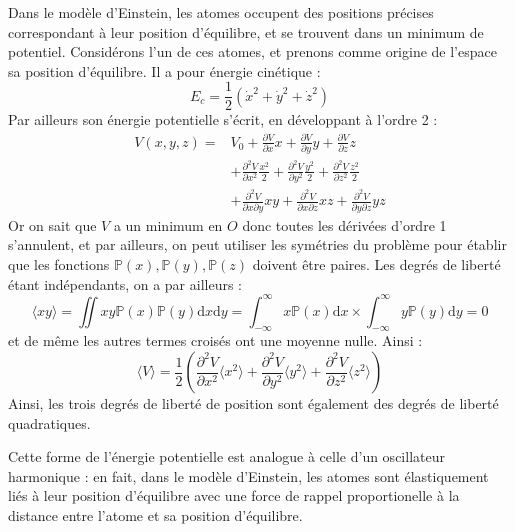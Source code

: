 \documentclass[11pt,fleqn]{book} %
\newcommand{\dd}{\mathrm{d}}
\begin{document}
Dans le modèle d'Einstein, les atomes occupent des positions précises correspondant à leur position d'équilibre, et se trouvent dans un minimum de potentiel. Considérons l'un de ces atomes, et prenons comme origine de l'espace sa position d'équilibre. Il a pour énergie cinétique :
\begin{equation}
	E_c = \frac{1}{2} (\dot x^2 + \dot y^2 + \dot z^2)
\end{equation}
Par ailleurs son énergie potentielle s'écrit, en développant à l'ordre 2 :
\begin{align}
	V(x,y,z) = &V_0 + \frac{\partial V}{\partial x} x + \frac{\partial V}{\partial y} y + \frac{\partial V}{\partial z} z \\
	&+ \frac{\partial^2 V}{\partial x^2} \frac{x^2}{2} + \frac{\partial^2 V}{\partial y^2} \frac{y^2}{2} + \frac{\partial^2 V}{\partial z^2} \frac{z^2}{2} \\
	&+ \frac{\partial^2 V}{\partial x \partial y} xy + \frac{\partial^2 V}{\partial x \partial z} xz + \frac{\partial^2 V}{\partial y \partial z} yz
\end{align}
Or on sait que $V$ a un minimum en $O$ donc toutes les dérivées d'ordre 1 s'annulent, et par ailleurs, on peut utiliser les symétries du problème pour établir que les fonctions $\mathbb{P}(x),\mathbb{P}(y),\mathbb{P}(z)$ doivent être paires. Les degrés de liberté étant indépendants, on a par ailleurs :
\begin{equation}
	\langle xy \rangle = \iint x y \mathbb{P}(x) \mathbb{P}(y) \dd x \dd y = \int_{-\infty}^\infty x \mathbb{P}(x) \dd x \times \int_{-\infty}^\infty y \mathbb{P}(y) \dd y = 0
\end{equation}
et de même les autres termes croisés ont une moyenne nulle. Ainsi :
\begin{equation}
	\langle V \rangle = \frac{1}{2} \left( \frac{\partial^2 V}{\partial x^2} \langle x^2 \rangle + \frac{\partial^2 V}{\partial y^2} \langle y^2 \rangle + \frac{\partial^2 V}{\partial z^2} \langle z^2 \rangle \right)
\end{equation}
Ainsi, les trois degrés de liberté de position sont également des degrés de liberté quadratiques.

\begin{remark}
	Cette forme de l'énergie potentielle est analogue à celle d'un oscillateur harmonique : en fait, dans le modèle d'Einstein, les atomes sont élastiquement liés à leur position d'équilibre avec une force de rappel proportionelle à la distance entre l'atome et sa position d'équilibre.
\end{remark}
\end{document}
